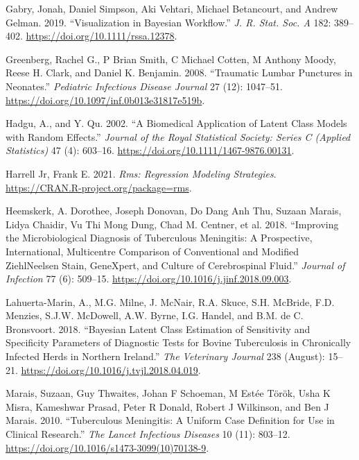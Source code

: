 \documentclass[
]{article}
\newlength{\cslhangindent}
\newlength{\cslentryspacingunit} %
\newenvironment{CSLReferences}[2] %
 {%
  \setlength{\parindent}{0pt}
  \ifodd #1
  \let\oldpar\par
  \def\par{\hangindent=\cslhangindent\oldpar}
  \fi
  \setlength{\parskip}{#2\cslentryspacingunit}
 }%
 {}
\begin{document}
\begin{CSLReferences}{1}{0}
\leavevmode{}%
Gabry, Jonah, Daniel Simpson, Aki Vehtari, Michael Betancourt, and Andrew Gelman. 2019. {``Visualization in Bayesian Workflow.''} \emph{J. R. Stat. Soc. A} 182: 389--402. \url{https://doi.org/10.1111/rssa.12378}.

\leavevmode{}%
Greenberg, Rachel G., P Brian Smith, C Michael Cotten, M Anthony Moody, Reese H. Clark, and Daniel K. Benjamin. 2008. {``Traumatic Lumbar Punctures in Neonates.''} \emph{Pediatric Infectious Disease Journal} 27 (12): 1047--51. \url{https://doi.org/10.1097/inf.0b013e31817e519b}.

\leavevmode{}%
Hadgu, A., and Y. Qu. 2002. {``A Biomedical Application of Latent Class Models with Random Effects.''} \emph{Journal of the Royal Statistical Society: Series C (Applied Statistics)} 47 (4): 603--16. \url{https://doi.org/10.1111/1467-9876.00131}.

\leavevmode{}%
Harrell Jr, Frank E. 2021. \emph{Rms: Regression Modeling Strategies}. \url{https://CRAN.R-project.org/package=rms}.

\leavevmode{}%
Heemskerk, A. Dorothee, Joseph Donovan, Do Dang Anh Thu, Suzaan Marais, Lidya Chaidir, Vu Thi Mong Dung, Chad M. Centner, et al. 2018. {``Improving the Microbiological Diagnosis of Tuberculous Meningitis: A Prospective, International, Multicentre Comparison of Conventional and Modified Ziehl{\textendash}Neelsen Stain, GeneXpert, and Culture of Cerebrospinal Fluid.''} \emph{Journal of Infection} 77 (6): 509--15. \url{https://doi.org/10.1016/j.jinf.2018.09.003}.

\leavevmode{}%
Lahuerta-Marin, A., M.G. Milne, J. McNair, R.A. Skuce, S.H. McBride, F.D. Menzies, S.J.W. McDowell, A.W. Byrne, I.G. Handel, and B.M. de C. Bronsvoort. 2018. {``Bayesian Latent Class Estimation of Sensitivity and Specificity Parameters of Diagnostic Tests for Bovine Tuberculosis in Chronically Infected Herds in Northern Ireland.''} \emph{The Veterinary Journal} 238 (August): 15--21. \url{https://doi.org/10.1016/j.tvjl.2018.04.019}.

\leavevmode{}%
Marais, Suzaan, Guy Thwaites, Johan F Schoeman, M Estée Török, Usha K Misra, Kameshwar Prasad, Peter R Donald, Robert J Wilkinson, and Ben J Marais. 2010. {``Tuberculous Meningitis: A Uniform Case Definition for Use in Clinical Research.''} \emph{The Lancet Infectious Diseases} 10 (11): 803--12. \url{https://doi.org/10.1016/s1473-3099(10)70138-9}.


\end{CSLReferences}
\end{document}
